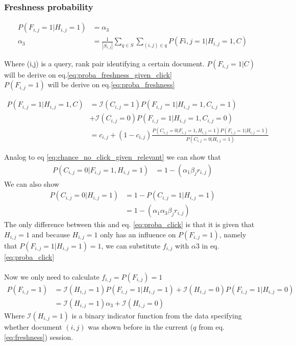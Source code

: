 \subsubsection{Freshness probability}
\begin{align}
	P(F_{i,j} = 1 | H_{i,j} = 1) &= \alpha_3 \\
	\alpha_3 &= \frac{1}{|S_{i,j}|} \sum_{q \in S} \sum_{(i,j) \in q} P(F{i,j}=1 | H_{i,j}=1, C)
	\label{eq:freshness}
\end{align}

Where (i,j) is a query, rank pair identifying a certain document.
$P(F_{i,j}=1 | C)$ will be derive on eq.\ref{eq:proba_freshness_given_click} \\
$P(F_{i,j}=1)$ will be derive on eq.\ref{eq:proba_freshness}

\begin{align}
	\label{eq:proba_freshness_given_click}
	P(F_{i,j}=1 | H_{i,j}=1, C)
	&= \mathcal{I}(C_{i,j} = 1) P(F_{i,j}=1|H_{i,j}=1,C_{i,j}=1) \\
	&+ \mathcal{I}(C_{i,j} = 0) P(F_{i,j}=1|H_{i,j}=1,C_{i,j}=0) \\
	&= c_{i,j} + (1-c_{i,j}) \frac {P(C_{i,j}=0|F_{i,j}=1,H_{i,j}=1) P(F_{i,j} = 1 | H_{i,j}=1)} {P(C_{i,j} = 0 | H_{i,j} = 1)}
\end{align}

Analog to eq \ref{eq:chance_no_click_given_relevant} we can show that
\begin{align}
	P(C_{i,j}=0|F_{i,j}=1, H_{i,j}=1) &= 1 - (\alpha_1 \beta_j r_{i,j})
	\label{eq:no_click_freshness}
\end{align}
We can also show
\begin{align}
	P(C_{i,j}=0|H_{i,j}=1) 
	&= 1 - P(C_{i,j}=1|H_{i,j}=1) \\
	&= 1-(\alpha_1 \alpha_3 \beta_j r_{i,j})
\end{align}
The only difference between this and eq.  \ref{eq:proba_click} is that it is given that $H_{i,j}=1$ and because $H_{i,j} = 1$ only has an influence on $P(F_{i,j}=1)$, namely that $P(F_{i,j}=1 | H_{i,j} = 1) = 1$, we can substitute $f_{i,j}$ with $\alpha3$ in eq. \ref{eq:proba_click}\\
\\
Now we only need to calculate $f_{i,j} = P(F_{i,j}) = 1$
\begin{align}
	\label{eq:proba_freshness}
	P(F_{i,j} = 1)
	&= \mathcal{I}(H_{i,j}=1) P(F_{i,j}=1|H_{i,j}=1) + \mathcal{I}(H_{i,j}=0) P(F_{i,j}=1|H_{i,j}=0) \\
	&= \mathcal{I}(H_{i,j}=1) \alpha_3 + \mathcal{I}(H_{i,j}=0)
\end{align}
Where $\mathcal{I}(H_{i,j}=1)$ is a binary indicator function from the data specifying whether document $(i,j)$ was shown before in the current ($q$ from eq. \ref{eq:freshness}) session.\\

